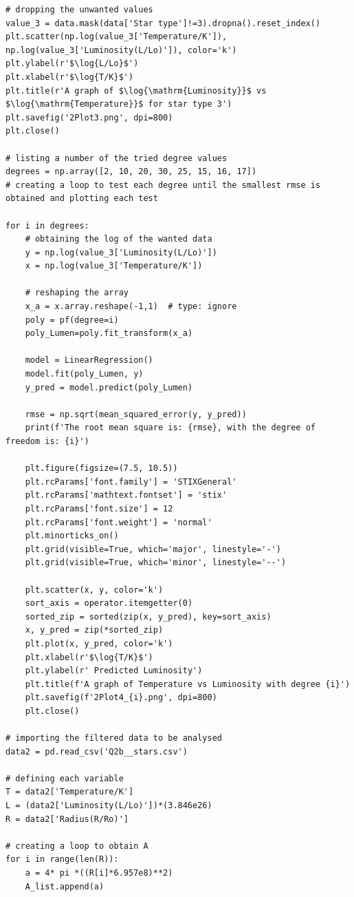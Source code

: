 \documentclass[12pt, a4paper]{article}
\begin{document}
\begin{verbatim}
# dropping the unwanted values
value_3 = data.mask(data['Star type']!=3).dropna().reset_index()
plt.scatter(np.log(value_3['Temperature/K']), np.log(value_3['Luminosity(L/Lo)']), color='k')
plt.ylabel(r'$\log{L/Lo}$')
plt.xlabel(r'$\log{T/K}$')
plt.title(r'A graph of $\log{\mathrm{Luminosity}}$ vs $\log{\mathrm{Temperature}}$ for star type 3')
plt.savefig('2Plot3.png', dpi=800)
plt.close()

# listing a number of the tried degree values
degrees = np.array([2, 10, 20, 30, 25, 15, 16, 17])
# creating a loop to test each degree until the smallest rmse is obtained and plotting each test

for i in degrees:
    # obtaining the log of the wanted data
    y = np.log(value_3['Luminosity(L/Lo)'])
    x = np.log(value_3['Temperature/K'])

    # reshaping the array
    x_a = x.array.reshape(-1,1)  # type: ignore
    poly = pf(degree=i)
    poly_Lumen=poly.fit_transform(x_a)

    model = LinearRegression()
    model.fit(poly_Lumen, y)
    y_pred = model.predict(poly_Lumen)

    rmse = np.sqrt(mean_squared_error(y, y_pred))
    print(f'The root mean square is: {rmse}, with the degree of freedom is: {i}')

    plt.figure(figsize=(7.5, 10.5))
    plt.rcParams['font.family'] = 'STIXGeneral'
    plt.rcParams['mathtext.fontset'] = 'stix'
    plt.rcParams['font.size'] = 12
    plt.rcParams['font.weight'] = 'normal'
    plt.minorticks_on()
    plt.grid(visible=True, which='major', linestyle='-')
    plt.grid(visible=True, which='minor', linestyle='--')

    plt.scatter(x, y, color='k')
    sort_axis = operator.itemgetter(0)
    sorted_zip = sorted(zip(x, y_pred), key=sort_axis)
    x, y_pred = zip(*sorted_zip)
    plt.plot(x, y_pred, color='k')
    plt.xlabel(r'$\log{T/K}$')
    plt.ylabel(r' Predicted Luminosity')
    plt.title(f'A graph of Temperature vs Luminosity with degree {i}')
    plt.savefig(f'2Plot4_{i}.png', dpi=800)
    plt.close()

# importing the filtered data to be analysed
data2 = pd.read_csv('Q2b__stars.csv')

# defining each variable
T = data2['Temperature/K']
L = (data2['Luminosity(L/Lo)'])*(3.846e26)
R = data2['Radius(R/Ro)']

# creating a loop to obtain A
for i in range(len(R)):
    a = 4* pi *((R[i]*6.957e8)**2)
    A_list.append(a)


\end{verbatim}
\end{document}
